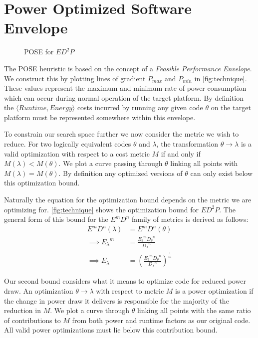 \section{Power Optimized Software Envelope}
\label{sec:pose}

\begin{figure}
\centering

\caption{POSE for $ED^2P$}
\label{fig:technique}
\end{figure}

The POSE heuristic is based on the concept of a \emph{Feasible Performance Envelope}.
We construct this by plotting lines of gradient $P_{max}$ and $P_{min}$ in \autoref{fig:technique}.
These values represent the maximum and minimum rate of power consumption which can occur during normal operation of the target platform. By definition the $\langle Runtime, Energy\rangle$ costs incurred by running any given code $\theta$ on the target platform must be represented somewhere within this envelope.

To constrain our search space further we now consider the metric we wish to reduce.
For two logically equivalent codes $\theta$ and $\lambda$, the transformation ${\theta \to \lambda}$ is a valid optimization with respect to a cost metric $M$ if and only if ${M(\lambda) < M(\theta)}$.
We plot a curve passing through $\theta$ linking all points with ${M(\lambda) = M(\theta)}$.
By definition any optimized versions of $\theta$ can only exist below this optimization bound.

Naturally the equation for the optimization bound depends on the metric we are optimizing for.
\autoref{fig:technique} shows the optimization bound for $ED^2P$.
The general form of this bound for the $E^mD^n$ family of metrics is derived as follows:
\begin{align}
E^mD^n(\lambda) &= E^mD^n(\theta) \nonumber \\
\implies {E_\lambda}^m &= \frac{{E_\theta}^m{D_\theta}^n}{{D_\lambda}^n} \nonumber \\
\implies E_\lambda &= (\frac{{E_\theta}^m{D_\theta}^n}{{D_\lambda}^n})^\frac{1}{m}
\label{eq:optimization}
\end{align}

Our second bound considers what it means to optimize code for reduced power draw. 
An optimization $\theta \to \lambda$ with respect to metric $M$ is a power optimization if the change in power draw it delivers is responsible for the majority of the reduction in $M$. We plot a curve through $\theta$ linking all points with the same ratio of contributions to $M$ from both power and runtime factors as our original code. All valid power optimizations must lie below this contribution bound. 

